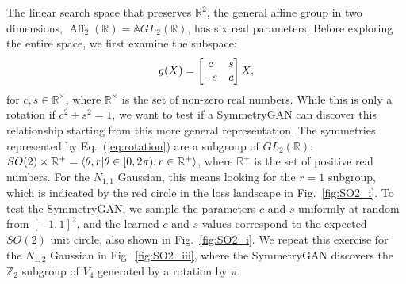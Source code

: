 \documentclass[aps,prx,reprint,preprintnumbers,superscriptaddress,nofootinbib,longbibliography,floatfix]{revtex4-1}
\newcommand{\A}{\mathbb{A}}
\newcommand{\R}{\mathbb{R}}
\newcommand{\Z}{\mathbb{Z}}
\DeclareRobustCommand{\Fig}[1]{Fig.~\ref{fig:#1}}
\DeclareRobustCommand{\Eq}[1]{Eq.~(\ref{eq:#1})}
\begin{document}
The linear search space that preserves $\R^2$, the general affine group in two dimensions, $\operatorname{Aff}_2(\R) = \A GL_2(\R)$, has six real parameters.
%
Before exploring the entire space, we first examine the subspace:
%
\begin{align}
\label{eq:rotation}
g(X) = \mqty[c&s\\-s&c]\,X,
\end{align}
%
for $c, s\in \R^\times$, where $\R^\times$ is the set of non-zero real numbers.
%
While this is only a rotation if $c^2+s^2=1$, we want to test if a SymmetryGAN can discover this relationship starting from this more general representation.
%
The symmetries represented by \Eq{rotation} are a subgroup of $GL_2(\R)$: $SO(2)\times \R^+ = \ev{\theta, r|\theta\in [0, 2\pi), r\in\R^+}$, where $\R^+$ is the set of positive real numbers.
%
For the $ N_{1,1}$ Gaussian, this means looking for the $r = 1$ subgroup, which is indicated by the red circle in the loss landscape in \Fig{SO2_i}.
%
To test the SymmetryGAN, we sample the parameters $c$ and $s$ uniformly at random from $[-1, 1]^2$, and the learned $c$ and $s$ values correspond to the expected $SO(2)$ unit circle, also shown in \Fig{SO2_i}.
%
We repeat this exercise for the $ N_{1,2}$ Gaussian in \Fig{SO2_iii}, where the SymmetryGAN discovers the $\Z_2$ subgroup of $V_4$ generated by a rotation by $\pi$.


\begin{figure*}[p]
    \centering
   $\quad$
    $\quad$
    \\

    \caption{The analytic loss landscapes overlaid with empirically discovered symmetries for the $N_{1,1}$ example with a cyclic-enforcing term added to the loss, to be compared to \Fig{SO2_i}.
    The cases studied are (i) $\Z_2$, (ii) $\Z_3$, and (iii) $\Z_7$.}
    \label{fig:MSE}
\end{figure*}

\begin{figure*}[p]
    \centering
     $\quad$
      $\quad$
  \\
  \caption{
    Slices through the analytic loss landscape together with empirically discovered symmetries for $\mathcal N_{1,1}$ with the full $\A GL_2(\R)$ search space.
    (i) The determinant-rotation angle space.  The maxima are indicated by vertical red lines.
    (ii) The dilatation-shear space.  The maximum is indicated by a red star.
    (iii) The affine translation space.  The maximum is indicated by a red star at the origin.}
    \label{fig:AGL2symm}
\end{figure*}
\end{document}
